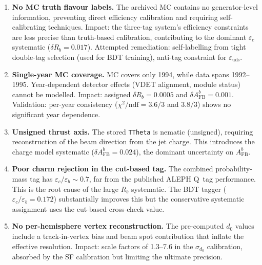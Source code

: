 \documentclass[11pt,a4paper]{article}
\begin{document}
\begin{enumerate}
\item \textbf{No MC truth flavour labels.}
  The archived MC contains no generator-level information, preventing
  direct efficiency calibration and requiring self-calibrating
  techniques.  Impact: the three-tag system's efficiency constraints
  are less precise than truth-based calibration, contributing to
  the dominant $\varepsilon_c$ systematic ($\delta R_b = 0.017$).
  Attempted remediation: self-labelling from tight double-tag selection
  (used for BDT training), anti-tag constraint for $\varepsilon_\mathrm{uds}$.

\item \textbf{Single-year MC coverage.}
  MC covers only 1994, while data spans 1992--1995.  Year-dependent
  detector effects (VDET alignment, module status) cannot be modelled.
  Impact: assigned $\delta R_b = 0.0005$ and $\delta A_\mathrm{FB}^b = 0.001$.
  Validation: per-year consistency ($\chi^2/\mathrm{ndf} = 3.6/3$ and
  $3.8/3$) shows no significant year dependence.

\item \textbf{Unsigned thrust axis.}
  The stored \texttt{TTheta} is nematic (unsigned), requiring
  reconstruction of the beam direction from the jet charge.  This
  introduces the charge model systematic ($\delta A_\mathrm{FB}^b = 0.024$),
  the dominant uncertainty on $A_\mathrm{FB}^b$.

\item \textbf{Poor charm rejection in the cut-based tag.}
  The combined probability-mass tag has $\varepsilon_c/\varepsilon_b \sim 0.7$,
  far from the published ALEPH Q~tag performance.  This is the root cause
  of the large $R_b$ systematic.  The BDT tagger ($\varepsilon_c/\varepsilon_b
  = 0.172$) substantially improves this but the conservative systematic
  assignment uses the cut-based cross-check value.

\item \textbf{No per-hemisphere vertex reconstruction.}
  The pre-computed $d_0$ values include a track-in-vertex bias and
  beam spot contribution that inflate the effective resolution.
  Impact: scale factors of 1.3--7.6 in the $\sigma_{d_0}$ calibration,
  absorbed by the SF calibration but limiting the ultimate precision.
\end{enumerate}

\end{document}

